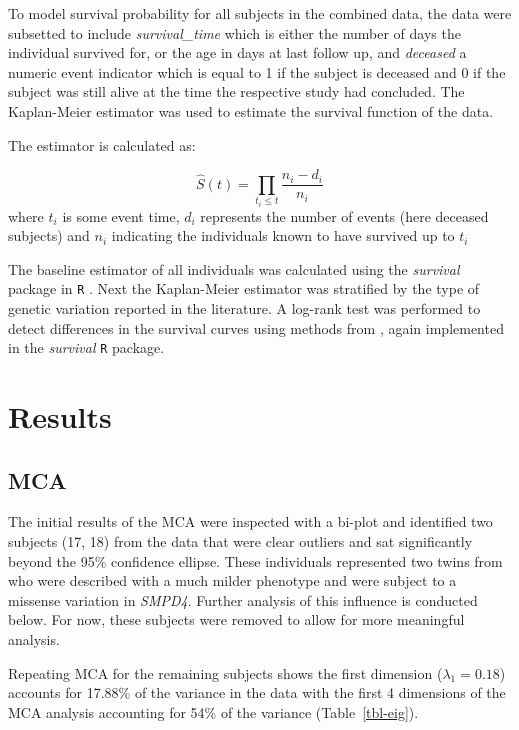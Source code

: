 \documentclass[
  authoryear,
  preprint,
  3p]{elsarticle}
\begin{document}
To model survival probability for all subjects in the combined data, the
data were subsetted to include \emph{survival\_time} which is either the
number of days the individual survived for, or the age in days at last
follow up, and \emph{deceased} a numeric event indicator which is equal
to 1 if the subject is deceased and 0 if the subject was still alive at
the time the respective study had concluded. The Kaplan-Meier estimator
\citep{kaplan1958nonparametric} was used to estimate the survival
function of the data.

The estimator is calculated as:

\[
\hat{S}(t) = \prod_{t_i \leq t}\frac{n_i - d_i}{n_i} 
\] where \(t_i\) is some event time, \(d_i\) represents the number of
events (here deceased subjects) and \(n_i\) indicating the individuals
known to have survived up to \(t_i\)

The baseline estimator of all individuals was calculated using the
\emph{survival} package in \texttt{R} \citep{survival-book}. Next the
Kaplan-Meier estimator was stratified by the type of genetic variation
reported in the literature. A log-rank test was performed to detect
differences in the survival curves using methods from
\citet{harrington1982class}, again implemented in the \emph{survival}
\texttt{R} package.

\hypertarget{results}{%
\section{Results}\label{results}}

\hypertarget{mca}{%
\subsection{MCA}\label{mca}}

The initial results of the MCA were inspected with a bi-plot and
identified two subjects (17, 18) from the data that were clear outliers
and sat significantly beyond the 95\% confidence ellipse. These
individuals represented two twins from \citet{magini2019loss} who were
described with a much milder phenotype and were subject to a missense
variation in \emph{SMPD4}. Further analysis of this influence is
conducted below. For now, these subjects were removed to allow for more
meaningful analysis.

Repeating MCA for the remaining subjects shows the first dimension
(\(\lambda_1 = 0.18\)) accounts for 17.88\% of the variance in the data
with the first 4 dimensions of the MCA analysis accounting for 54\% of
the variance (Table~\ref{tbl-eig}).
\end{document}
